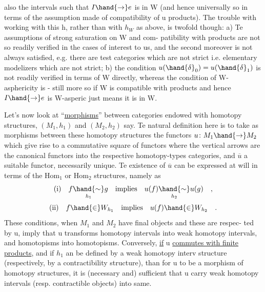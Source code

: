 also the intervals such that $I \hand{\to} e$ is  in W (and hence universally
so in terms of the assumption made of compatibility of u  products).
The trouble with  working with this h,  rather than with $h_W$ as above,
is twofold though:  a)  Te assumptions of strong saturation on W and com-%
patibility with products  are not so readily verified in the cases
of interest to us,  and the second moreover is not always satisfied,  e.g.
there are test categories which are not strict i.e. elementary modelizers
which are not strict;  b)  the condition $u(\hand{\delta}_0) = u(\hand{\delta}_1)$  is not readily
verified in terms of W directly,  whereas the condition of W-asphericity
is  -  still more so if W is compatible with products and hence $I \hand{\to} e$ is
W-asperic just means it is in W.

     Let's now look at ``\uline{morphisms}'' between categories endowed with
homotopy structures,    $(M_1,h_1)$ and $(M_2,h_2)$ say.
Te natural definition here is to take as morphisms between these homotopy
structures the functors   $u\colon M_1 \hand{\to} M_2$  which give rise to a commutative
square of functors
where the vertical arrows are the canonical functors into the respective
homotopy-types categories,  and $\overline{u}$  a suitable functor,  necessarily unique.
Te existence of $\overline{u}$  can be expressed at will in terms of the $\mathrm{Hom}_1$ or $\mathrm{Hom}_2$
structures,  namely as
\[ \text{(i)}\quad f \underset{h_1}{\hand{\sim}} g \quad\text{implies}\quad u(f) \underset{h_2}{\hand{\sim}} u(g) \quad , \]
 
\[ \text{(ii)}\quad f \hand{\in} W_{h_1} \quad\text{implies}\quad u(f) \hand{\in} W_{h_2} \quad . \]
These conditions,  when $M_1$ and $M_2$ have final objects and these are respec-%
ted by u,  imply that u transforms  homotopy intervals into weak homotopy
intervals,  and homotopisms into homotopisms.  Conversely,  \uline{if} u \uline{commutes
with finite products},  and if $h_1$ an be defined by a weak homotopy interv
structure (respectively,  by a contractibility structure),  than for u to
be a morphism of homotopy structures,  it is (necessary and) sufficient
that u carry weak homotopy intervals (resp. contractible objects) into
same.


